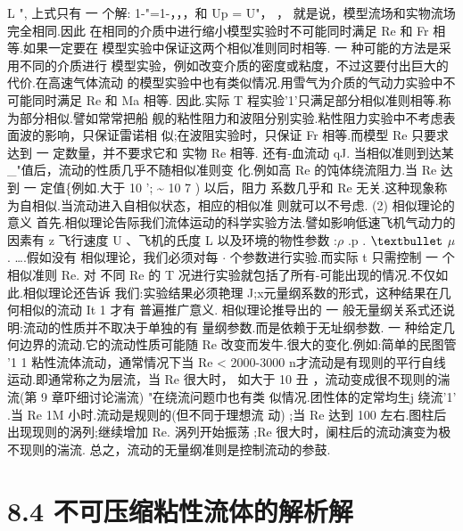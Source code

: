 L ", 上式只有 一 个解: 1-"=1-，，，和 Up = U"， ， 就是说，模型流场和实物流场完全相同.因此 在相同的介质中进行缩小模型实验时不可能同时满足 Re 和 Fr 相等.如果一定要在 模型实验中保证这两个相似准则同时相等. 一 种可能的方法是采用不同的介质进行 模型实验，例如改变介质的密度或粘度，不过这要付出巨大的代价.在高速气体流动 的模型实验中也有类似情况.用雪气为介质的气动力实验中不可能同时满足 Re 和 Ma 相等. 因此.实际 T 程实验'1'只满足部分相似准则相等.称为部分相似.譬如常常把船 舰的粘性阻力和波阻分别实验.粘性阻力实验中不考虑表面波的影响，只保证雷诺相 似;在波阻实验时，只保证 Fr 相等.而模型 Re 只要求达到 一 定数量，并不要求它和 实物 Re 相等. 还有-血流动 qJ. 当相似准则到达某 \_"值后，流动的性质几乎不随相似准则变 化.例如高 Re 的饨体绕流阻力.当 Re 达到 一 定值\{例如.大于 10 '; \textasciitilde{} 10 7 ) 以后，阻力 系数几乎和 Re 无关.这种现象称为自相似.当流动进入自相似状态，相应的相似准 则就可以不号虑. (2) 相似理论的意义 首先.相似理论告际我们流体运动的科学实验方法.譬如影响低速飞机气动力的 因素有 z 飞行速度 U 、飞机的氏度 L 以及环境的物性参数 :$\rho$ .p . ${\rm •}$ $\mu$. ….假如没有 相似理论，我们必须对每 $\cdot $ 个参数进行实验.而实际 t 只需控制 一 个相似准则 Re. 对 不同 Re 的 T 况进行实验就包括了所有-可能出现的情况.不仅如此.相似理论还告诉 我们:实验结果必须艳理 J;x元量纲系数的形式，这种结果在几何相似的流动 It 1 才有 普遍推广意义. 相似理论推导出的 一 般无量纲关系式还说明:流动的性质并不取决于单独的有 量纲参数.而是依赖于无址纲参数. 一 种给定几何边界的流动.它的流动性质可能随 Re 改变而发牛.很大的变化.例如:简单的民图管 '1 1 粘性流体流动，通常情况下当 Re < 2000-3000 n才流动是有现则的平行自线运动.即通常称之为层流，当 Re 很大时， 如大于 10 丑 ，流动变成很不现则的湍流(第 9 章吓细讨论湍流) "在绕流问题巾也有类 似情况.团性体的定常均生j 绕流'1' .当 Re 1M 小时.流动是规则的(但不同于理想流 动) ;当 Re 达到 100 左右.图柱后出现现则的涡列;继续增加 Re. 涡列开始振荡 ;Re 很大时，阑柱后的流动演变为极不现则的湍流. 总之，流动的无量纲准则是控制流动的参鼓.

\section*{8.4  不可压缩粘性流体的解析解}

